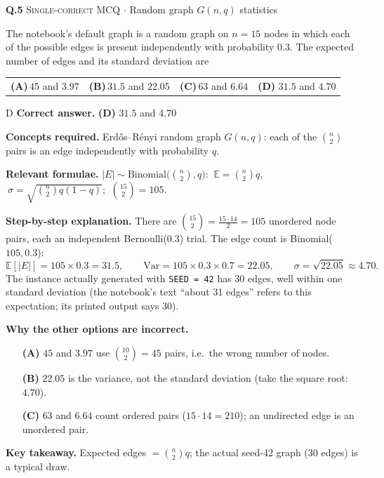 \documentclass[11pt,a4paper]{article}
\newcommand{\optlabel}[1]{\textbf{(#1)}}
\newcommand{\correctlabel}[1]{\textcolor{okgreen}{\textbf{(#1)}\,\ding{51}}}
\newenvironment{qitem}[1]{\begin{list}{}{\setlength{\leftmargin}{3.3em}\setlength{\labelwidth}{3.1em}%
  \setlength{\labelsep}{0.2em}\setlength{\topsep}{3pt}\setlength{\parsep}{3pt}}\item[\textbf{Q.#1}\hfill]}{\end{list}}
\newcommand{\qsep}{\par\vspace{2pt}{\color{black!15}\hrule}\vspace{4pt}}
\newcommand{\qmeta}[2]{{\footnotesize\color{black!60}\textsc{#1} \;$\cdot$\; #2}\par}
\begin{document}
\begin{qitem}{5}
\qmeta{Single-correct MCQ}{Random graph $G(n, q)$ statistics}
The notebook's default graph is a random graph on $n = 15$ nodes in which each of the possible edges is present
independently with probability $0.3$. The expected number of edges and its standard deviation are
\par\smallskip\noindent\begin{tabularx}{\linewidth}{@{}*{4}{L}@{}}
\optlabel{A}\,$45$ and $3.97$ & \optlabel{B}\,$31.5$ and $22.05$ & \optlabel{C}\,$63$ and $6.64$ & \correctlabel{D}\,$31.5$ and $4.70$
\end{tabularx}
\end{qitem}
\begin{solbox}{D}
\textbf{\color{brand}Correct answer.} \textcolor{okgreen}{\textbf{(D)}} $31.5$ and $4.70$

\textbf{\color{brand}Concepts required.} Erd\H{o}s--R\'enyi random graph $G(n, q)$: each of the $\binom n2$ pairs is an edge independently with probability $q$.

\textbf{\color{brand}Relevant formulae.} $|E| \sim \mathrm{Binomial}\big(\binom n2, q\big)$: $\ \mathbb E = \binom n2 q$, $\ \sigma = \sqrt{\binom n2 q(1-q)}$; $\ \binom{15}{2} = 105$.

\textbf{\color{brand}Step-by-step explanation.} There are $\binom{15}{2} = \frac{15\cdot 14}{2} = 105$ unordered node pairs, each an independent Bernoulli($0.3$) trial.
The edge count is Binomial($105, 0.3$):
\[ \mathbb{E}[|E|] = 105 \times 0.3 = 31.5, \qquad \mathrm{Var} = 105 \times 0.3 \times 0.7 = 22.05, \qquad \sigma = \sqrt{22.05} \approx 4.70. \]
The instance actually generated with \texttt{SEED = 42} has $30$ edges, well within one standard deviation (the notebook's
text ``about 31 edges'' refers to this expectation; its printed output says 30).

\textbf{\color{brand}Why the other options are incorrect.}
\begin{itemize}[leftmargin=2.4em, itemsep=1pt, topsep=2pt]
\item[\textbf{(A)}] $45$ and $3.97$ use $\binom{10}{2} = 45$ pairs, i.e.\ the wrong number of nodes.
\item[\textbf{(B)}] $22.05$ is the variance, not the standard deviation (take the square root: $4.70$).
\item[\textbf{(C)}] $63$ and $6.64$ count ordered pairs ($15\cdot14 = 210$); an undirected edge is an unordered pair.
\end{itemize}
\textbf{\color{brand}Key takeaway.} Expected edges $= \binom n2 q$; the actual seed-42 graph (30 edges) is a typical draw.
\end{solbox}
\qsep
\end{document}
